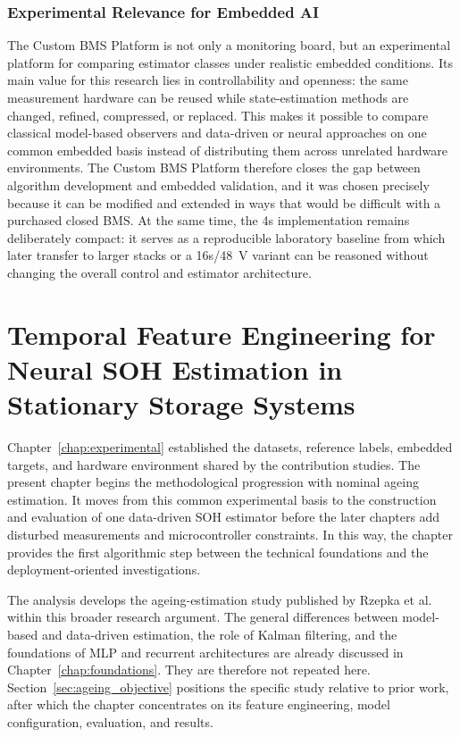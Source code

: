 \documentclass[
    a4paper,
    12pt,
    titlepage,
    bibliography=totoc,
    twoside=on,
    parskip=false,
    numbers=noenddot,
    cleardoublepage=empty,
    DIV=12,
    BCOR=12.0mm,
    headheight=36pt,
    headings=openright
]{scrreprt}
\begin{document}
\subsection{Experimental Relevance for Embedded AI}
The Custom BMS Platform is not only a monitoring board, but an experimental platform for comparing estimator classes under realistic embedded conditions. Its main value for this research lies in controllability and openness: the same measurement hardware can be reused while state-estimation methods are changed, refined, compressed, or replaced. This makes it possible to compare classical model-based observers and data-driven or neural approaches on one common embedded basis instead of distributing them across unrelated hardware environments. The Custom BMS Platform therefore closes the gap between algorithm development and embedded validation, and it was chosen precisely because it can be modified and extended in ways that would be difficult with a purchased closed BMS. At the same time, the 4s implementation remains deliberately compact: it serves as a reproducible laboratory baseline from which later transfer to larger stacks or a 16s/\SI{48}{\volt} variant can be reasoned without changing the overall control and estimator architecture.

\chapter{Temporal Feature Engineering for Neural SOH Estimation in Stationary Storage Systems}
\label{chap:ageing}
Chapter~\ref{chap:experimental} established the datasets, reference labels, embedded targets, and hardware environment shared by the contribution studies. The present chapter begins the methodological progression with nominal ageing estimation. It moves from this common experimental basis to the construction and evaluation of one data-driven SOH estimator before the later chapters add disturbed measurements and microcontroller constraints. In this way, the chapter provides the first algorithmic step between the technical foundations and the deployment-oriented investigations.

The analysis develops the ageing-estimation study published by Rzepka et al. within this broader research argument.\autocite{rzepkaNeuralNetworkArchitecture2023a} The general differences between model-based and data-driven estimation, the role of Kalman filtering, and the foundations of MLP and recurrent architectures are already discussed in Chapter~\ref{chap:foundations}. They are therefore not repeated here. Section~\ref{sec:ageing_objective} positions the specific study relative to prior work, after which the chapter concentrates on its feature engineering, model configuration, evaluation, and results.
\end{document}

